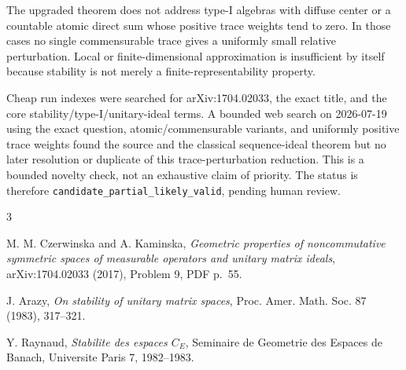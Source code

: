 \documentclass[11pt]{amsart}
\begin{document}
The upgraded theorem does not address type-I algebras with diffuse center or a
countable atomic direct sum whose positive trace weights tend to zero.  In
those cases no single commensurable trace gives a uniformly small relative
perturbation.  Local or finite-dimensional approximation is insufficient by
itself because stability is not merely a finite-representability property.

Cheap run indexes were searched for arXiv:1704.02033, the exact title, and the
core stability/type-I/unitary-ideal terms.  A bounded web search on 2026-07-19
using the exact question, atomic/commensurable variants, and uniformly positive
trace weights found the source and the classical sequence-ideal theorem but no
later resolution or duplicate of this trace-perturbation reduction.  This is a
bounded novelty check, not an exhaustive claim of priority.  The status is therefore
\texttt{candidate\_partial\_likely\_valid}, pending human review.

\begin{thebibliography}{3}

M. M. Czerwinska and A. Kaminska,
\emph{Geometric properties of noncommutative symmetric spaces of measurable
operators and unitary matrix ideals}, arXiv:1704.02033 (2017), Problem 9,
PDF p.~55.

J. Arazy,
\emph{On stability of unitary matrix spaces},
Proc. Amer. Math. Soc. 87 (1983), 317--321.

Y. Raynaud,
\emph{Stabilite des espaces $C_E$},
Seminaire de Geometrie des Espaces de Banach, Universite Paris 7, 1982--1983.

\end{thebibliography}
\end{document}
